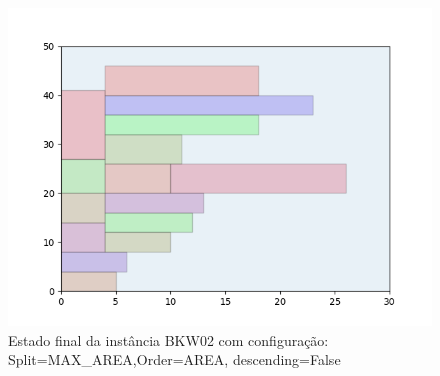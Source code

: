 \begin{figure}[H]
    \centering
    \caption[]{Estado final da instância BKW02 com configuração: Split=MAX_AREA,Order=AREA, descending=False}
    \label{fig:bkw02-max_area-area-false}
    \includegraphics[scale=0.5]{output/figures/bkw/bkw02/max_area/area/false/00}
\end{figure}